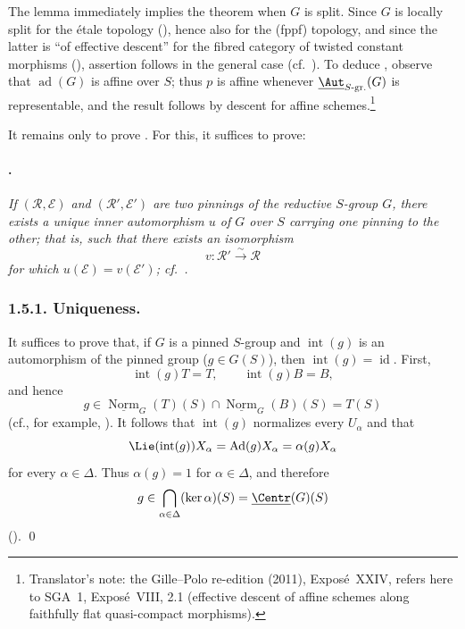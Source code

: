The lemma immediately implies the theorem when \(G\) is split. Since
\(G\) is locally split for the étale topology \textup{()}, hence also for the \textup{(fppf)} topology, and since the
latter is ``of effective descent'' for the fibred category of twisted
constant morphisms \textup{()}, assertion \textup{}
follows in the general case \textup{(cf.\ )}. To deduce
\textup{}, observe that \(\operatorname{ad}(G)\) is affine over
\(S\); thus \(p\) is affine whenever
\(\underline{\Aut}_{S\text{-}\mathrm{gr.}}(G)\) is representable, and
the result follows by descent for affine schemes.\footnote{Translator's note: the Gille--Polo re-edition (2011), Exposé~XXIV, refers here
to SGA~1, Exposé~VIII, 2.1 (effective descent of affine schemes along faithfully flat quasi-compact
morphisms).}

It remains only to prove . For this, it suffices to prove:

\paragraph{.}
\emph{If \((\mathscr R,\mathcal E)\) and
\((\mathscr R',\mathcal E')\) are two pinnings of the reductive
\(S\)-group \(G\), there exists a unique inner automorphism \(u\) of
\(G\) over \(S\) carrying one pinning to the other; that is, such that
there exists an isomorphism
\[
  v:\mathscr R'\xrightarrow{\sim}\mathscr R
\]
for which \(u(\mathcal E)=v(\mathcal E')\); cf.\ .}

\subsubsection*{1.5.1. Uniqueness.}
It suffices to prove that, if \(G\) is a pinned \(S\)-group and
\(\operatorname{int}(g)\) is an automorphism of the pinned group
\textup{(\(g\in G(S)\))}, then \(\operatorname{int}(g)=\operatorname{id}\).
First,
\[
  \operatorname{int}(g)T=T,\qquad
  \operatorname{int}(g)B=B,
\]
and hence
\[
  g\in
  \underline{\operatorname{Norm}}_G(T)(S)
  \cap\underline{\operatorname{Norm}}_G(B)(S)
  =T(S)
\]
\textup{(cf., for example, )}. It follows that
\(\operatorname{int}(g)\) normalizes every \(U_\alpha\) and that
\[
  \Lie(\operatorname{int}(g))X_\alpha
  =\operatorname{Ad}(g)X_\alpha
  =\alpha(g)X_\alpha
\]
for every \(\alpha\in\Delta\). Thus \(\alpha(g)=1\) for
\(\alpha\in\Delta\), and therefore
\[
  g\in
  \bigcap_{\alpha\in\Delta}(\ker\alpha)(S)
  =\underline{\Centr}(G)(S)
\]
\textup{()}. \qed
